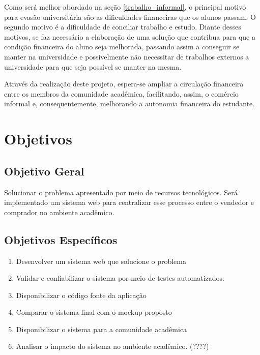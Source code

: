 Como será melhor abordado na seção \ref{trabalho_informal}, o principal motivo para evasão universitária são as dificuldades financeiras que os alunos passam. O segundo motivo é a dificuldade de conciliar trabalho e estudo. Diante desses motivos, se faz necessário a elaboração de uma solução que contribua para que a condição financeira do aluno seja melhorada, passando assim a conseguir se manter na universidade e possivelmente não necessitar de trabalhos externos a universidade para que seja possível se manter na mesma.

Através da realização deste projeto, espera-se ampliar a circulação financeira entre os membros da comunidade acadêmica, facilitando, assim, o comércio informal e, consequentemente, melhorando a autonomia financeira do estudante.

\section{Objetivos}

\subsection{ Objetivo Geral}

Solucionar o problema apresentado por meio de recursos tecnológicos. Será implementado um sistema web para centralizar esse processo entre o vendedor e comprador no ambiente acadêmico.

\subsection{Objetivos Específicos}
\begin{enumerate}
    \item Desenvolver um sistema web que solucione o problema
    \item Validar e confiabilizar o sistema por meio de testes automatizados.
    \item Disponibilizar o código fonte da aplicação
    \item Comparar o sistema final com o mockup proposto
    \item Disponibilizar o sistema para a comunidade acadêmica
    \item Analisar o impacto do sistema no ambiente acadêmico. (????)
\end{enumerate}


